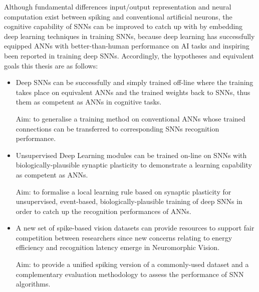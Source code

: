 Although fundamental differences \protect{} \protect{} input/output representation and neural computation exist between spiking and conventional artificial neurons, the cognitive capability of SNNs can be improved to catch up with \protect{} \protect{} by embedding deep learning techniques in training SNNs, because deep learning has successfully equipped ANNs with better-than-human performance on AI tasks and inspiring \protect{} \protect{} been reported in training deep SNNs.
Accordingly, the hypotheses and equivalent goals \protect{} \protect{} this thesis are as follows: 
\begin{itemize}

	\item 
Deep SNNs can be successfully and simply trained off-line where the training takes place on equivalent ANNs and \protect{} the trained weights \protect{} back to \protect{} SNNs, thus \protect{} \protect{} them as competent as ANNs in cognitive tasks. 
	
	Aim: to generalise a training method on conventional ANNs whose trained connections can be transferred to corresponding SNNs \protect{} \protect{} recognition performance.

	\item 
	Unsupervised Deep Learning modules can be trained on-line on SNNs with biologically-plausible synaptic plasticity to demonstrate a learning capability as competent as ANNs.

	Aim: to formalise a local learning rule based on synaptic plasticity for unsupervised, event-based, biologically-plausible training of deep SNNs in order to catch up \protect{} the recognition performances of ANNs.

	\item 
	A new set of spike-based vision datasets can provide resources to support fair competition between researchers since new concerns relating to energy efficiency and recognition latency emerge in Neuromorphic Vision.

	Aim: to provide a unified spiking version of a commonly-used dataset and a complementary evaluation methodology to assess the performance of SNN algorithms.
\end{itemize}


